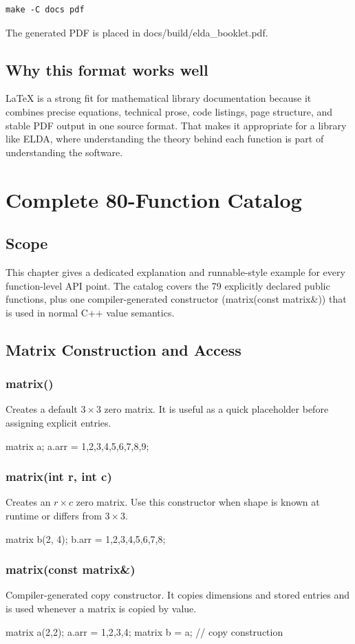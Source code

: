 \documentclass[11pt,a4paper,openany]{book}
\def\code#1{#1}%
\def\ELDA{ELDA}%
\newcommand{\ELDA}{\textsc{ELDA}}
\DeclareRobustCommand{\code}[1]{\texttt{\detokenize{#1}}}
\newcommand{\FunctionCard}[3]{
    \subsection{\code{#1}}
    #2
    \begin{examplebox}[Example]
    \code{#3}
    \end{examplebox}
}
\begin{document}
\begin{lstlisting}[style=eldaCpp]
make -C docs pdf
\end{lstlisting}

The generated PDF is placed in \code{docs/build/elda_booklet.pdf}.

\section{Why this format works well}
LaTeX is a strong fit for mathematical library documentation because it combines precise equations, technical prose, code listings, page structure, and stable PDF output in one source format. That makes it appropriate for a library like \ELDA{}, where understanding the theory behind each function is part of understanding the software.

\chapter{Complete 80-Function Catalog}

\section{Scope}
This chapter gives a dedicated explanation and runnable-style example for every function-level API point.
The catalog covers the 79 explicitly declared public functions, plus one compiler-generated constructor (\code{matrix(const matrix\&)}) that is used in normal C++ value semantics.

\section{Matrix Construction and Access}

\FunctionCard{matrix()}{Creates a default \(3 \times 3\) zero matrix. It is useful as a quick placeholder before assigning explicit entries.}{
matrix a;
a.arr = {{1,2,3},{4,5,6},{7,8,9}};
}

\FunctionCard{matrix(int r, int c)}{Creates an \(r \times c\) zero matrix. Use this constructor when shape is known at runtime or differs from \(3 \times 3\).}{
matrix b(2, 4);
b.arr = {{1,2,3,4},{5,6,7,8}};
}

\FunctionCard{matrix(const matrix\&)}{Compiler-generated copy constructor. It copies dimensions and stored entries and is used whenever a matrix is copied by value.}{
matrix a(2,2);
a.arr = {{1,2},{3,4}};
matrix b = a; // copy construction
}
\end{document}
